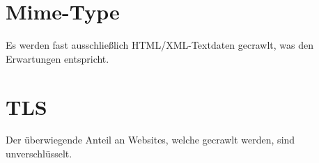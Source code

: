\documentclass[a4paper,12pt,titlepage=false]{scrreprt}
\begin{document}
\section{Mime-Type}
\vspace{.1cm}

Es werden fast ausschließlich HTML/XML-Textdaten gecrawlt, was den Erwartungen entspricht.

\section{TLS}
\vspace{.1cm}
Der überwiegende Anteil an Websites, welche gecrawlt werden, sind unverschlüsselt.
\end{document}
